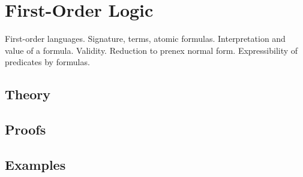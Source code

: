 
\section{First-Order Logic}
\label{sec:2.3a.04-first-order-logic}

\begin{ticket}
First-order languages. Signature, terms, atomic formulas. Interpretation and value of a formula. Validity. Reduction to prenex normal form. Expressibility of predicates by formulas.
\end{ticket}

\subsection*{Theory}

\subsection*{Proofs}

\subsection*{Examples}
